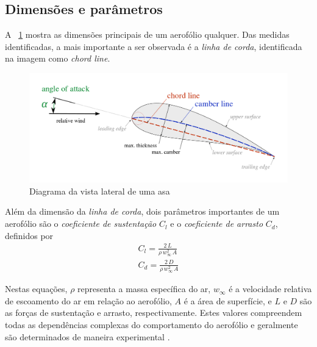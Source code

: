 \documentclass{article}
\let\oldforeignlanguage\foreignlanguage
\renewcommand\foreignlanguage[2]{\oldforeignlanguage{#1}{\emph{#2}}}
\begin{document}
	\subsection{Dimensões e parâmetros}
	A \figurename\ \ref{fig:diagrama-asa} mostra as dimensões principais de um aerofólio qualquer. 
	Das medidas identificadas, a mais importante a ser observada é a \emph{linha de corda}, identificada na imagem como \foreignlanguage{english}{chord line}.

	\begin{figure}[ht]
		\centering
		\includegraphics[scale=0.3]{diagrama-asa.png}
		\caption{Diagrama da vista lateral de uma asa}
		\label{fig:diagrama-asa}
	\end{figure}

	Além da dimensão da \emph{linha de corda}, dois parâmetros importantes de um aerofólio são o \emph{coeficiente de sustentação} $C_l$ e o \emph{coeficiente de arrasto} $C_d$, definidos por \cite{nasa:liftcoeff,nasa:dragcoeff}
	\begin{align}
		C_l = \frac{2\,L}{\rho\,w_\infty^2\,A}\label{eqn:coef-lift}\\
		C_d = \frac{2\,D}{\rho\,w_\infty^2\,A}\label{eqn:coef-drag}
	\end{align}

	Nestas equações, $\rho$ representa a massa específica do ar, $w_\infty$ é a velocidade relativa de escoamento do ar em relação ao aerofólio, $A$ é a área de superfície, e $L$ e $D$ são as forças de sustentação e arrasto, respectivamente.
	Estes valores compreendem todas as dependências complexas do comportamento do aerofólio e geralmente são determinados de maneira experimental \cite{nasa:liftcoeff}.
\end{document}
